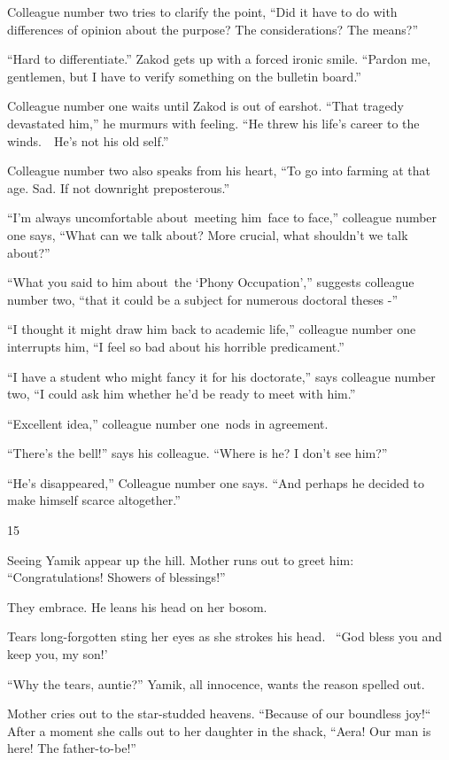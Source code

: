 \documentclass[twoside,11pt]{book}
\begin{document}
Colleague number two tries to clarify the point, ``Did it have to do with differences of opinion about the
purpose? The considerations? The means?'' 

``Hard to differentiate.'' Zakod gets up with a forced ironic smile. ``Pardon me,
gentlemen, but I have to verify something on the bulletin board.''

Colleague number one waits until Zakod is out of earshot. ``That tragedy devastated him,'' he
murmurs with feeling. ``He threw his life's career to the winds.\ \ He's not his old self.'' 

Colleague number two also speaks from his heart, ``To go into farming at that age. Sad. If not downright
preposterous.'' 

{}``I'm always uncomfortable about~meeting him~face to face,'' colleague number one says, ``What can we talk about? More
crucial, what shouldn't we talk about?''

``What you said to him about~the `Phony Occupation',{}'' suggests colleague number two, ``that it could be
a subject for numerous doctoral theses -'' 

``I thought it might draw him back to academic life,'' colleague number one interrupts him, ``I feel so bad
about his horrible predicament.'' 

``I have a student who might fancy it for his doctorate,'' says colleague number two, ``I could ask him
whether he'd be ready to meet with him.'' 

``Excellent idea,'' colleague number one~nods in agreement. 

``There's the bell!'' says his colleague. ``Where is he? I don't see him?'' 

{}``He's disappeared,'' Colleague number one says. ``And perhaps he decided to make himself
scarce altogether.''


\bigskip

15~~

Seeing Yamik appear up the hill. Mother runs out to greet him: ``Congratulations! Showers of
blessings!'' \ 

They embrace. He leans his head on her bosom.

Tears long-forgotten sting her eyes as she strokes his head. \ {}``God bless you and keep you, my son!' 

``Why the tears, auntie?'' Yamik, all innocence, wants the reason spelled out. 

Mother cries out to the star-studded heavens. ``Because of our boundless joy!``~ After a
moment she calls out to her daughter in the shack, ``Aera! Our man is here! The
father-to-be!''
\end{document}
